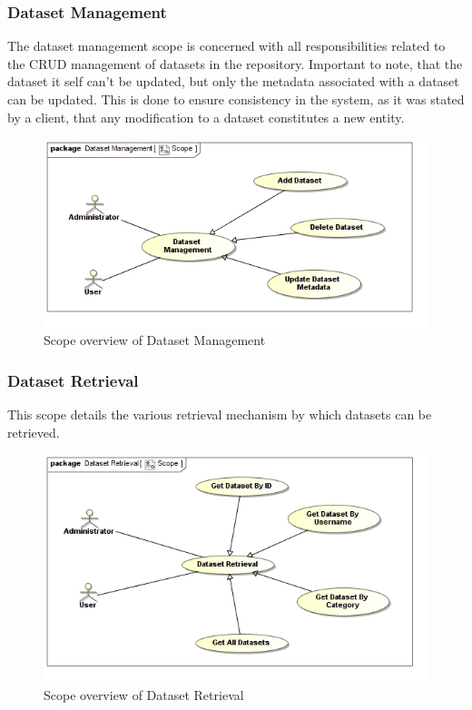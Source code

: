 \subsubsection{Dataset Management}
The dataset management scope is concerned with all responsibilities related to
the CRUD management of datasets in the repository. Important to note, that the
dataset it self can't be updated, but only the metadata associated with a 
dataset can be updated. This is done to ensure consistency in the system, as it
was stated by a client, that any modification to a dataset constitutes a new 
entity.
\begin{figure}[H]
  \begin{center}
  \includegraphics[scale=0.38]{../Diagrams and Charts/Repository Management/Dataset Management Scope.jpg}
  \caption{Scope overview of Dataset Management}
  \end{center}  
\end{figure}

\subsubsection{Dataset Retrieval}
This scope details the various retrieval mechanism by which datasets can be 
retrieved.
\begin{figure}[H]
  \begin{center}
  \includegraphics[scale=0.38]{../Diagrams and Charts/Repository Management/Dataset Retrieval Scope.jpg}
  \caption{Scope overview of Dataset Retrieval}
  \end{center}  
\end{figure}

